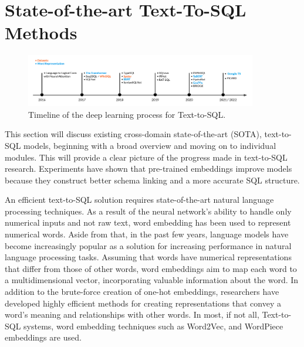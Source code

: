 \section{State-of-the-art Text-To-SQL Methods}

\begin{figure}[htb]
    \centering
    \includegraphics[width=0.9\textwidth]{pics/Timeline.png}
    \caption{Timeline of the deep learning process for Text-to-SQL.}
    \label{fig:timeline}
\end{figure}

This section will discuss existing cross-domain state-of-the-art (SOTA), text-to-SQL models, beginning with a broad overview and moving on to individual modules. This will provide a clear picture of the progress made in text-to-SQL research. Experiments have shown that pre-trained embeddings improve models because they construct better schema linking and a more accurate SQL structure.

An efficient text-to-SQL solution requires state-of-the-art natural language processing techniques.
As a result of the neural network's ability to handle only numerical inputs and not raw text, word embedding has been used to represent numerical words.
Aside from that, in the past few years, language models have become increasingly popular as a solution for increasing performance in natural language processing tasks.
Assuming that words have numerical representations that differ from those of other words, word embeddings aim to map each word to a multidimensional vector, incorporating valuable information about the word. In addition to the brute-force creation of one-hot embeddings, researchers have developed highly efficient methods for creating representations that convey a word's meaning and relationships with other words. In most, if not all, Text-to-SQL systems, word embedding techniques such as Word2Vec\cite{DBLP:journals/corr/Rong14}, and WordPiece embeddings\cite{DBLP:journals/corr/WuSCLNMKCGMKSJL16} are used.

